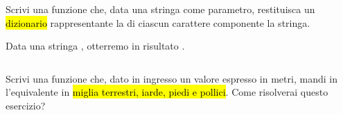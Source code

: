 \documentclass[a4paper,11pt,addpoints]{exam}
\begin{document}
\begin{questions}
    \questionspace

    \question[3]  Scrivi una funzione che, data una stringa come parametro, restituisca un \hl{dizionario}
    rappresentante la  di ciascun carattere componente la stringa.

    \begin{examples}
        \item Data una stringa , otterremo in risultato .
    \end{examples}

    \begin{solution}
        \small\inputminted{python}{solution/011.py}
    \end{solution}

    \questionspace

    \question[4]  Scrivi una funzione che, dato in ingresso un valore espresso in metri, mandi in 
    l'equivalente in \hl{miglia terrestri, iarde, piedi e pollici}. Come risolverai questo esercizio?


\end{questions}
\end{document}
